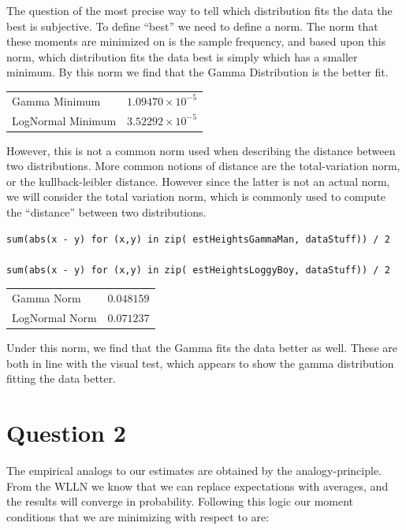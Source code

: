 \documentclass[12pt]{paper}
\begin{document}
The question of the most precise way to tell which distribution fits
the data the best is subjective. To define ``best'' we need to define
a norm. The norm that these moments are minimized on is the sample
frequency, and based upon this norm, which distribution fits the data
best is simply which has a smaller minimum. By this norm we find that
the Gamma Distribution is the better fit.

\vspace{.25in}
\begin{tabular}{ll}
  Gamma Minimum & $1.09470 \times 10^{-5}$\\
  LogNormal Minimum & $3.52292 \times 10^{-5}$\\
\end{tabular}
\vspace{.25in}

However, this is not a common norm used when describing the distance
between two distributions. More common notions of distance are the
total-variation norm, or the kullback-leibler
distance. However since the latter is not an actual norm, we will
consider the total variation norm, which is commonly used to compute
the ``distance'' between two distributions.

\begin{verbatim}
sum(abs(x - y) for (x,y) in zip( estHeightsGammaMan, dataStuff)) / 2

sum(abs(x - y) for (x,y) in zip( estHeightsLoggyBoy, dataStuff)) / 2
\end{verbatim}



\begin{tabular}{ll}
  Gamma Norm & $0.048159$\\
  LogNormal Norm & $0.071237$
\end{tabular}

\vspace{.25in}

Under this norm, we find that the Gamma fits the data better as
well. These are both in line with the visual test, which appears to
show the gamma distribution fitting the data better.

\section{Question 2}

The empirical analogs to our estimates are obtained by the
analogy-principle. From the WLLN we know that we can replace
expectations with averages, and the results will converge in
probability. Following this logic our moment conditions that we are
minimizing with respect to are:
\end{document}
